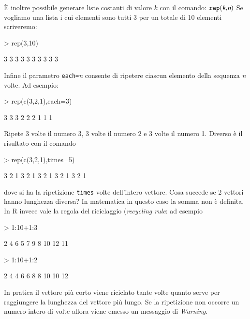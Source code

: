 \documentclass[onecolumn,11pt]{book}
\newcommand{\varia}[1]{\textsl{\textsf{#1}}}
\begin{document}
\`E inoltre possibile generare liste costanti di valore $k$ con il comando:
$\texttt{rep} (\varia{k,n})$
Se vogliamo una lista i cui elementi sono tutti 3 per un totale di 10 elementi scriveremo:
\begin{Schunk}
\begin{Sinput}
> rep(3,10)
\end{Sinput}
\begin{Soutput}
 [1] 3 3 3 3 3 3 3 3 3 3
\end{Soutput}
\end{Schunk}
Infine il parametro \texttt{each=}\varia{n} consente di ripetere ciascun elemento della sequenza \varia{n} volte. Ad esempio:
\begin{Schunk}
\begin{Sinput}
> rep(c(3,2,1),each=3)
\end{Sinput}
\begin{Soutput}
[1] 3 3 3 2 2 2 1 1 1
\end{Soutput}
\end{Schunk}
Ripete 3 volte il numero 3, 3 volte il numero 2 e 3 volte il numero 1. 
Diverso \`e il risultato con il comando 
\begin{Schunk}
\begin{Sinput}
> rep(c(3,2,1),times=5)
\end{Sinput}
\begin{Soutput}
 [1] 3 2 1 3 2 1 3 2 1 3 2 1 3 2 1
\end{Soutput}
\end{Schunk}
dove si ha la ripetizione \texttt{times} volte dell'intero vettore.
Cosa succede se 2 vettori hanno lunghezza diversa? In matematica in questo caso la somma non \`e definita. In \textsf{R} invece vale la regola del riciclaggio (\textit{recycling rule}: ad esempio
\begin{Schunk}
\begin{Sinput}
> 1:10+1:3
\end{Sinput}
\begin{Soutput}
 [1]  2  4  6  5  7  9  8 10 12 11
\end{Soutput}
\begin{Sinput}
> 1:10+1:2
\end{Sinput}
\begin{Soutput}
 [1]  2  4  4  6  6  8  8 10 10 12
\end{Soutput}
\end{Schunk}
In pratica il vettore pi\`u corto viene riciclato tante volte quanto serve per raggiungere la lunghezza del vettore pi\`u lungo. Se la ripetizione non occorre un numero intero di volte allora viene emesso un messaggio di \textit{Warning}.
\end{document}
